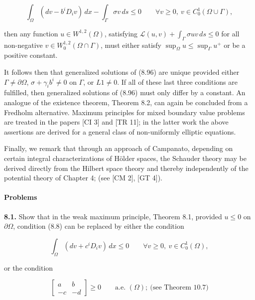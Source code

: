 \begin{equation}
\tag{8.98}
\int_{\Omega}(dv-b^iD_iv)\,dx-\int_{\Gamma}\sigma v\,ds\le 0 \qquad \forall v\ge 0,\ v\in C^1_0(\Omega\cup\Gamma),
\end{equation}

then any function $u\in W^{1,2}(\Omega)$, satisfying $\mathcal{L}(u,v)+\int_{\Gamma}\sigma uv\,ds\le 0$ for all non-negative $v\in W^{1,2}_0(\Omega\cap\Gamma)$, must either satisfy $\sup_{\Omega}u\le \sup_{\Gamma}u^+$ or be a positive constant.

It follows then that generalized solutions of (8.96) are unique provided either $\Gamma\neq \partial\Omega$, $\sigma+\gamma_i b^i\neq 0$ on $\Gamma$, or $L1\neq 0$. If all of these last three conditions are fulfilled, then generalized solutions of (8.96) must only differ by a constant. An analogue of the existence theorem, Theorem 8.2, can again be concluded from a Fredholm alternative. Maximum principles for mixed boundary value problems are treated in the papers [CI 3] and [TR 11]; in the latter work the above assertions are derived for a general class of non-uniformly elliptic equations.

Finally, we remark that through an approach of Campanato, depending on certain integral characterizations of Hölder spaces, the Schauder theory may be derived directly from the Hilbert space theory and thereby independently of the potential theory of Chapter 4; (see [CM 2], [GT 4]).

\paragraph{Problems}

\textbf{8.1.} Show that in the weak maximum principle, Theorem 8.1, provided $u\le 0$ on $\partial\Omega$, condition (8.8) can be replaced by either the condition

\begin{equation}
\tag{8.99}
\int_{\Omega}(dv+c^iD_iv)\,dx\le 0 \qquad \forall v\ge 0,\ v\in C^1_0(\Omega),
\end{equation}

or the condition

\begin{equation}
\tag{8.100}
\begin{bmatrix}
a & b\\
-c & -d
\end{bmatrix}\ge 0 \qquad \text{a.e. }(\Omega);\ \text{(see Theorem 10.7)}
\end{equation}

